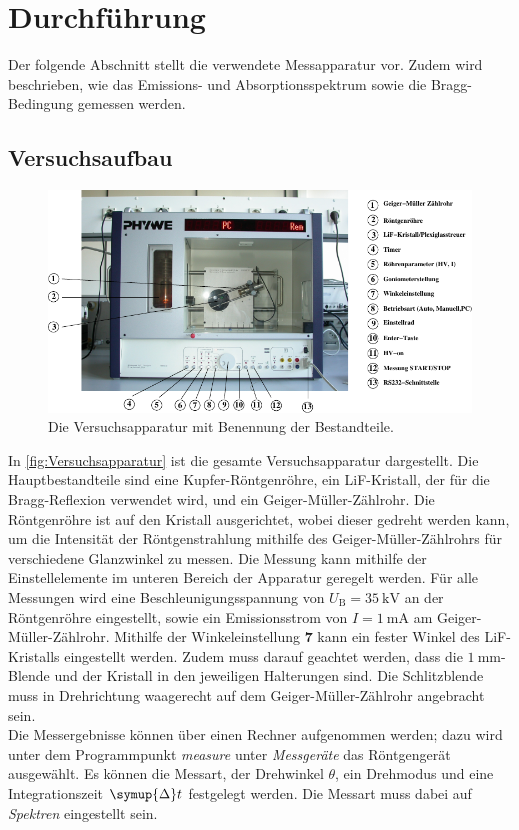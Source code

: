 \section{Durchführung}

    Der folgende Abschnitt stellt die verwendete Messapparatur vor.
    Zudem wird beschrieben,
    wie das Emissions- und Absorptionsspektrum
    sowie die Bragg-Bedingung gemessen werden.


\subsection{Versuchsaufbau}

    \begin{figure}
        \centering
        \includegraphics[width=\textwidth]{content/img/Abb_4_compressed.pdf}
        \caption{Die Versuchsapparatur mit Benennung der Bestandteile. \cite{versuchsanleitung}}
        \label{fig:Versuchsapparatur}
    \end{figure}

    In \autoref{fig:Versuchsapparatur} ist die gesamte Versuchsapparatur dargestellt.
    Die Hauptbestandteile sind eine Kupfer-Röntgenröhre,
    ein LiF-Kristall,
    der für die Bragg-Reflexion verwendet wird,
    und ein Geiger-Müller-Zählrohr.
    Die Röntgenröhre ist auf den Kristall ausgerichtet,
    wobei dieser gedreht werden kann,
    um die Intensität der Röntgenstrahlung mithilfe des Geiger-Müller-Zählrohrs für verschiedene Glanzwinkel zu messen.
    Die Messung kann mithilfe der Einstellelemente im unteren Bereich der Apparatur geregelt werden.
    Für alle Messungen wird eine Beschleunigungsspannung von $U_\text{B} = \SI{35}{\kilo\volt}$ an der Röntgenröhre eingestellt,
    sowie ein Emissionsstrom von $I = \SI{1}{\milli\ampere}$ am Geiger-Müller-Zählrohr.
    Mithilfe der Winkeleinstellung \textbf{7} kann ein fester Winkel des LiF-Kristalls eingestellt werden.
    Zudem muss darauf geachtet werden,
    dass die $\SI{1}{\milli\meter}$-Blende und der Kristall in den jeweiligen Halterungen sind.
    Die Schlitzblende muss in Drehrichtung waagerecht auf dem Geiger-Müller-Zählrohr angebracht sein.
    \\
    Die Messergebnisse können über einen Rechner aufgenommen werden;
    dazu wird unter dem Programmpunkt \textit{measure} unter \textit{Messgeräte} das Röntgengerät ausgewählt.
    Es können die Messart, der Drehwinkel $\theta$, ein Drehmodus und eine Integrationszeit $\symup{\Delta}t$ festgelegt werden.
    Die Messart muss dabei auf \textit{Spektren} eingestellt sein.


